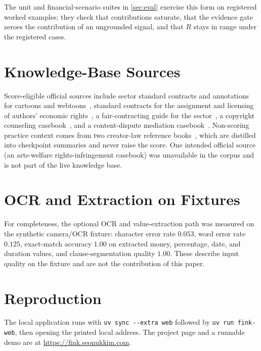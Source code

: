 \documentclass{article}
\theoremstyle{plain}
\begin{document}
The unit and financial-scenario suites in \cref{sec:eval} exercise this form on
registered worked examples; they check that contributions saturate, that the
evidence gate zeroes the contribution of an ungrounded signal, and that $R$ stays
in range under the registered cases.

\section{Knowledge-Base Sources}
\label{app:kb}

Score-eligible official sources include sector standard contracts and annotations
for cartoons and webtoons~\citep{kocca_webtoon_standard2025}, standard contracts
for the assignment and licensing of authors' economic
rights~\citep{mcst_rights_standard2018}, a fair-contracting guide for the
sector~\citep{kocca_fair_contract2023}, a copyright counseling
casebook~\citep{kcc_casebook2025}, and a content-dispute mediation
casebook~\citep{ccr_casebook2024}. Non-scoring practice context comes from two
creator-law reference books~\citep{book_webtoon_lawyer,book_korean_law_life},
which are distilled into checkpoint summaries and never raise the score. One
intended official source (an arts-welfare rights-infringement casebook) was
unavailable in the corpus and is not part of the live knowledge base.

\section{OCR and Extraction on Fixtures}
\label{app:ocr}

For completeness, the optional OCR and value-extraction path was measured on the
synthetic camera/OCR fixture: character error rate $0.053$, word error rate
$0.125$, exact-match accuracy $1.00$ on extracted money, percentage, date, and
duration values, and clause-segmentation quality $1.00$. These describe input
quality on the fixture and are not the contribution of this paper.

\section{Reproduction}
\label{app:repro}

The local application runs with \texttt{uv sync -{}-extra web} followed by
\texttt{uv run fink-web}, then opening the printed local address. The project page
and a runnable demo are at \url{https://fink.seonukkim.com}.
\end{document}
